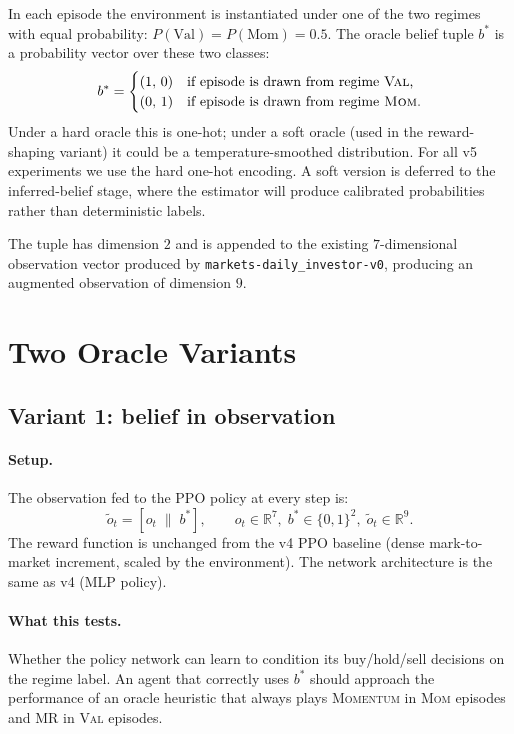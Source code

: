 \documentclass[11pt]{article}
\begin{document}
In each episode the environment is instantiated under one of the two regimes
with equal probability:
$P(\text{Val}) = P(\text{Mom}) = 0.5$.
The oracle belief tuple $b^*$ is a probability vector over these two
classes:
\[
  b^* =
  \begin{cases}
    (1,\, 0) & \text{if episode is drawn from regime \textsc{Val},} \\
    (0,\, 1) & \text{if episode is drawn from regime \textsc{Mom}.}
  \end{cases}
\]
Under a hard oracle this is one-hot; under a soft oracle (used in the
reward-shaping variant) it could be a temperature-smoothed distribution.
For all v5 experiments we use the hard one-hot encoding. A soft version
is deferred to the inferred-belief stage, where the estimator will produce
calibrated probabilities rather than deterministic labels.

The tuple has dimension $2$ and is appended to the existing $7$-dimensional
observation vector produced by \texttt{markets-daily\_investor-v0},
producing an augmented observation of dimension $9$.

\section{Two Oracle Variants}
\label{sec:variants}

\subsection{Variant 1: belief in observation}

\paragraph{Setup.}
The observation fed to the PPO policy at every step is:
\[
  \tilde{o}_t = [o_t \;\|\; b^*],
  \qquad o_t \in \mathbb{R}^7,\; b^* \in \{0,1\}^2,\;
  \tilde{o}_t \in \mathbb{R}^9.
\]
The reward function is unchanged from the v4 PPO baseline (dense
mark-to-market increment, scaled by the environment).
The network architecture is the same as v4 (MLP policy).

\paragraph{What this tests.}
Whether the policy network can learn to condition its buy/hold/sell
decisions on the regime label. An agent that correctly uses $b^*$
should approach the performance of an oracle heuristic that always plays
\textsc{Momentum} in \textsc{Mom} episodes and MR in \textsc{Val}
episodes.
\end{document}
